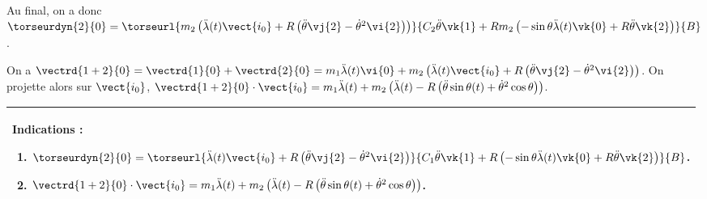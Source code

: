 Au final, on a donc $\torseurdyn{2}{0}=\torseurl{%
m_2\left(\ddot{\lambda}(t) \vect{i_0} + R \left(\ddot{\theta} \vj{2} - \dot{\theta}^2 \vi{2}\right)\right)
}{%
C_2  \ddot{\theta} \vk{1} + Rm_2\left( -\sin \theta \ddot{\lambda}(t) \vk{0} + R \ddot{\theta} \vk{2}\right)
}{B}$.
\else
\fi

\ifprof

On a $\vectrd{1+2}{0}=\vectrd{1}{0}+\vectrd{2}{0}=m_1\ddot{\lambda}(t)\vi{0}+m_2\left(\ddot{\lambda}(t) \vect{i_0} + R \left(\ddot{\theta} \vj{2} - \dot{\theta}^2 \vi{2}\right)\right)$.
On projette alors sur $\vect{i_0}$,
$\vectrd{1+2}{0}\cdot \vect{i_0} =m_1\ddot{\lambda}(t)+m_2\left(\ddot{\lambda}(t)-R \left(\ddot{\theta} \sin\theta(t)  + \dot{\theta}^2 \cos\theta \right)\right) $.
\else
\fi


\ifcolle
\else
\fi


\ifprof
\else
\ifcolle
\else
\footnotesize
\begin{marginfigure}
\begin{tabular}{|p{.9\linewidth}|}
\hline
Indications :
\begin{enumerate}
\item $\torseurdyn{2}{0}=\torseurl{\ddot{\lambda}(t) \vect{i_0} + R \left(\ddot{\theta} \vj{2} - \dot{\theta}^2 \vi{2}\right)}{C_1  \ddot{\theta} \vk{1} + R\left( -\sin \theta \ddot{\lambda}(t) \vk{0} + R \ddot{\theta} \vk{2}\right)}{B}$.
\item $\vectrd{1+2}{0}\cdot \vect{i_0}=m_1\ddot{\lambda}(t)+m_2\left(\ddot{\lambda}(t)- R \left(\ddot{\theta} \sin\theta(t)  + \dot{\theta}^2 \cos\theta \right)\right)$. 
\end{enumerate} \\ \hline
\end{tabular}
\end{marginfigure}
\normalsize
\fi


\fi

